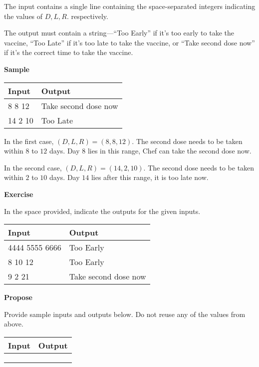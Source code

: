 \documentclass[a4paper]{exam}
\newcommand\heading[1]{\textbf{#1}}
\begin{document}
\begin{questions}
    The input contains a single line containing the space-separated integers indicating the values of  $D,L,R.$ respectively.

    The output must contain a string---``Too Early'' if it's too early to take the vaccine, ``Too Late'' if it's too late to take the vaccine, or ``Take second dose now'' if it's the correct time to take the vaccine.

    \heading{Sample}

    \begin{tabularx}{\textwidth}{|X|X|}
        \rowcolor{gray!50}
        \hline
        Input   & Output               \\ \hline\hline
        8 8 12 & Take second dose now \\\hline
        14 2 10 & Too Late             \\\hline
    \end{tabularx}

    In the first case, $(D,L,R) = (8,8,12)$. The second dose needs to be taken within $8$ to $12$ days. Day $8$ lies in this range, Chef can take the second dose now.

    In the second case, $(D,L,R) = (14,2,10)$. The second dose needs to be taken within $2$ to $10$ days. Day $14$ lies after this range, it is too late now.

    \heading{Exercise}

    In the space provided, indicate the outputs for the given inputs.

    \begin{tabularx}{\textwidth}{|X|X|}
        \rowcolor{gray!50}
        \hline
        Input          & Output                                       \\ \hline\hline
        4444 5555 6666 & Too Early                              \\\hline
        8 10 12        & Too Early                              \\\hline
        9 2 21         & Take second dose now \\\hline
    \end{tabularx}

    \heading{Propose}

    Provide sample inputs and outputs below. Do not reuse any of the values from above.

    \begin{tabularx}{\textwidth}{|X|X|}
        \rowcolor{gray!50}
        \hline
        Input & Output \\ \hline\hline
              &        \\\hline
              &        \\\hline
              &        \\\hline
    \end{tabularx}



\end{questions}
\end{document}

